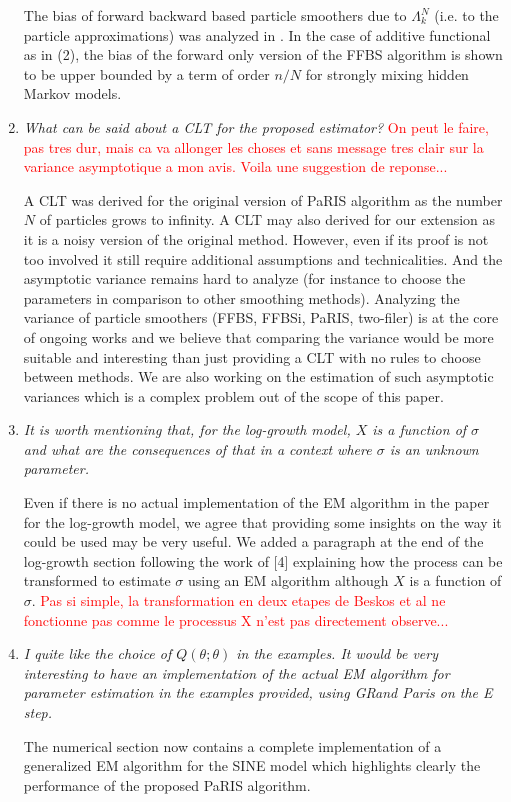 \documentclass[12pt]{article}
\newcommand{\1}{\mathrm{1}}
\begin{document}
\begin{enumerate}
The bias of forward backward based particle smoothers due to $\Lambda_k^N$ (i.e. to the particle approximations) was analyzed in \cite{delmoral:doucet:singh:2010}. In the case of additive functional as in (2), the bias of the forward only version of the FFBS algorithm is shown to be upper bounded by a term of order $n/N$ for strongly mixing hidden Markov models.  


\item {\em What can be said about a CLT for the proposed estimator?}
\textcolor{red}{On peut le faire, pas tres dur, mais ca va allonger les choses et sans message tres clair sur la variance asymptotique a mon avis. Voila une suggestion de reponse...}

\vspace{.3cm}

A CLT was derived for the original version of PaRIS algorithm as the number $N$ of particles grows to infinity. A CLT may also derived for our extension as it is a noisy version of the original method. However, even if its proof is not too involved it still require additional assumptions and technicalities. And the asymptotic variance remains hard to analyze (for instance to choose the parameters in comparison to other smoothing methods). Analyzing the variance of particle smoothers (FFBS, FFBSi, PaRIS, two-filer) is at the core of ongoing works and we believe that comparing the variance would be more suitable and interesting than just providing a CLT with no rules to choose between methods. We are also working on the estimation of such asymptotic variances which is a complex problem out of the scope of this paper.

\item {\em It is worth mentioning that, for the log-growth model, $X$ is a function of $\sigma$ and what
are the consequences of that in a context where $\sigma$ is an unknown parameter.}

\vspace{.3cm}

Even if there is no actual implementation of the EM algorithm in the paper for the log-growth model, we agree that providing some insights on the way it could be used may be very useful. We added a paragraph at the end of the log-growth section following the work of [4] explaining how the process can be transformed to estimate $\sigma$ using an EM algorithm although $X$ is a function of $\sigma$. \textcolor{red}{Pas si simple, la transformation en deux etapes de Beskos et al ne fonctionne pas comme le processus X n'est pas directement observe...}

\item {\em I quite like the choice of $Q(\theta;\theta)$ in the examples. It would be very interesting to
have an implementation of the actual EM algorithm for parameter estimation in the
examples provided, using GRand Paris on the E step.}

\vspace{.3cm}

The numerical section now contains a complete implementation of a generalized EM algorithm for the SINE model which highlights clearly the performance of the proposed PaRIS algorithm.  
\end{enumerate}
\end{document}
